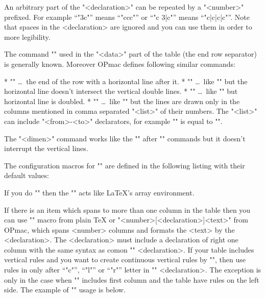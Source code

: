 An arbitrary part of the "<declaration>" can be repeated by a "<number>"
prefixed. For example ``"3c"'' means ``"ccc"'' or ``"c 3{|c}"'' means
``"c|c|c|c"''. Note that spaces in the <declaration> are ignored and you 
can use them in order to more legibility.
 
The command "\cr" used in the "<data>" part of the table (the end row
separator) is generally known. 
Moreover OPmac defines following similar commands:

\begitems
* "\crl" \dots\ the end of the row with a horizontal line after it.
* "\crli" \dots\ like "\crl" but the horizontal line doesn't intersect the
      vertical double lines.
* "\crlli" \dots\ like "\crli" but horizontal line is doubled.
* "" \dots\ like "\crli" but the lines are drawn only in the
columns mentioned in comma separated "<list>" of their numbers.
The "<list>" can include "<from>-<to>" declarators, for example
"" is equal to "". 
\enditems

The "\tskip<dimen>" command works like the "" 
after "\cr*" commands but it doesn't interrupt the vertical lines.

The configuration macros for "\table" are defined in the following listing
with their default values:

\begtt
\def\tabiteml{\enspace} %
\def\tabitemr{\enspace} %
\def\tabstrut{\strut}   %
\def\vvkern{1pt}        %
\def\hhkern{1pt}        %
\endtt

If you do "\def\tabiteml{$\enspace}\def\tabitemr{\enspace$}" then
the "\table" acts like \LaTeX's array environment.

If there is an item which spans to more than one column in the table then you can use
"" macro from plain \TeX{} or "\mspan<number>[<declaration>]{<text>}"
from OPmac, which spans <number> columns and formats the <text> by the
<declaration>. The <declaration> must include a declaration of right one column
with the same syntax as comon "\table" <declaration>.
If your table includes vertical rules and you want to
create continuous vertical rules by "\mspan", then use rules in
only after ``"c"'', ``"l"'' or ``"r"'' letter in "\mspan" <declaration>. The
exception is only in the case when "\mspan" includes first
column and the table have rules on the left side. The example of "\mspan" usage is below.

